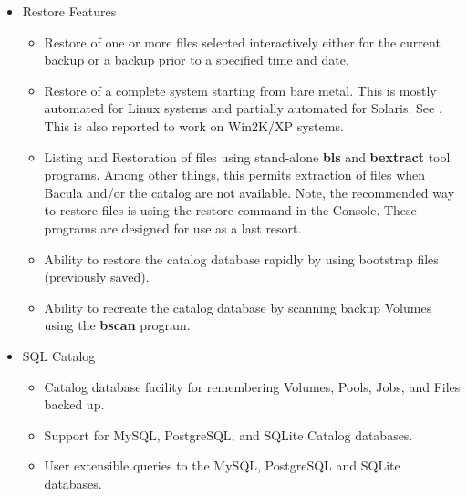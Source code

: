 \begin{itemize}
\item Restore Features
   \begin{itemize}
   \item Restore of one or more files selected interactively either for the
      current backup or a backup prior to a specified time and date.  
   \item Restore of a complete system starting from bare  metal. This is mostly
      automated for Linux systems and  partially automated for Solaris. See 
      . This is also
      reported to work on Win2K/XP systems.  
   \item Listing and Restoration of files using stand-alone {\bf bls} and  {\bf
      bextract} tool programs. Among other things, this permits  extraction of files
      when Bacula and/or the catalog are not  available. Note, the recommended way
      to restore files is using  the restore command in the Console. These programs
      are designed  for use as a last resort. 
   \item Ability to restore the catalog database rapidly by using bootstrap
      files (previously saved).
   \item Ability to recreate the catalog database by scanning backup Volumes 
      using the {\bf bscan} program.  
   \end{itemize}

\item SQL Catalog
   \begin{itemize}
   \item Catalog database facility for remembering Volumes, Pools, Jobs,  and
      Files backed up.  
   \item Support for MySQL, PostgreSQL, and SQLite Catalog databases.  
   \item User extensible queries to the MySQL, PostgreSQL and SQLite databases.  
   \end{itemize}


\end{itemize}
